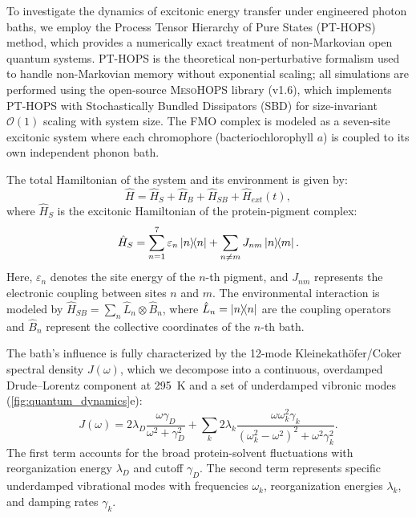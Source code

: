 \documentclass[journal=jpcl,manuscript=letter]{achemso}
\begin{document}
To investigate the dynamics of excitonic energy transfer under engineered photon baths, we employ the Process Tensor Hierarchy of Pure States (PT-HOPS) method,\cite{Suess2014,Citty2024a} which provides a numerically exact treatment of non-Markovian open quantum systems. PT-HOPS is the theoretical non-perturbative formalism used to handle non-Markovian memory without exponential scaling; all simulations are performed using the open-source \textsc{MesoHOPS} library (v1.6),\cite{Varvelo2021a} which implements PT-HOPS with Stochastically Bundled Dissipators (SBD) for size-invariant $\mathcal{O}(1)$ scaling with system size. The FMO complex is modeled as a seven-site excitonic system where each chromophore (bacteriochlorophyll $a$) is coupled to its own independent phonon bath.

The total Hamiltonian of the system and its environment is given by:
\begin{equation}
\hat{H} = \hat{H}_S + \hat{H}_B + \hat{H}_{SB} + \hat{H}_{ext}(t),
\label{eq:total_hamiltonian}
\end{equation}
where $\hat{H}_S$ is the excitonic Hamiltonian of the protein-pigment complex:
\begin{equation}
\hat{H}_S = \sum_{n=1}^{7} \varepsilon_n \dyad{n} + \sum_{n \neq m} J_{nm} \dyad{n}{m}.
\label{eq:excitonic_hamiltonian}
\end{equation}
Here, $\varepsilon_n$ denotes the site energy of the $n$-th pigment, and $J_{nm}$ represents the electronic coupling between sites $n$ and $m$. The environmental interaction is modeled by $\hat{H}_{SB} = \sum_n \hat{L}_n \otimes \hat{B}_n$, where $\hat{L}_n = \dyad{n}$ are the coupling operators and $\hat{B}_n$ represent the collective coordinates of the $n$-th bath.

The bath's influence is fully characterized by the 12-mode Kleinekathöfer/Coker spectral density $J(\omega)$, which we decompose into a continuous, overdamped Drude--Lorentz component at \SI{295}{\kelvin} and a set of underdamped vibronic modes (\cref{fig:quantum_dynamics}e):
\begin{equation}
J(\omega) = 2\lambda_D \frac{\omega \gamma_D}{\omega^2 + \gamma_D^2} + \sum_{k} 2\lambda_k \frac{\omega \omega_k^2 \gamma_k}{(\omega_k^2 - \omega^2)^2 + \omega^2 \gamma_k^2}.
\label{eq:spectral_density}
\end{equation}
The first term accounts for the broad protein-solvent fluctuations with reorganization energy $\lambda_D$ and cutoff $\gamma_D$. The second term represents specific underdamped vibrational modes with frequencies $\omega_k$, reorganization energies $\lambda_k$, and damping rates $\gamma_k$.
\end{document}
